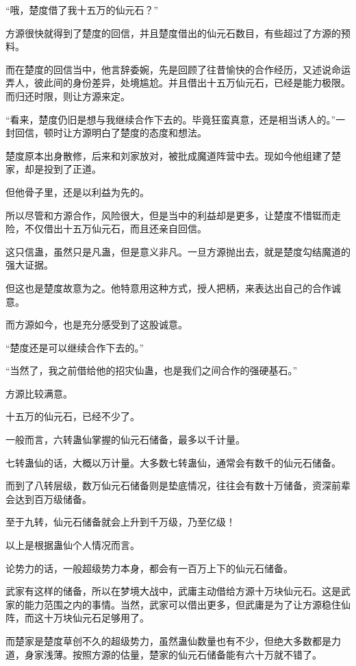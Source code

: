 
\begin{this_body}

“哦，楚度借了我十五万的仙元石？”

方源很快就得到了楚度的回信，并且楚度借出的仙元石数目，有些超过了方源的预料。

而在楚度的回信当中，他言辞委婉，先是回顾了往昔愉快的合作经历，又述说命运弄人，彼此间的身份差异，处境尴尬。并且借出十五万仙元石，已经是能力极限。而归还时限，则让方源来定。

“看来，楚度仍旧是想与我继续合作下去的。毕竟狂蛮真意，还是相当诱人的。”一封回信，顿时让方源明白了楚度的态度和想法。

楚度原本出身散修，后来和刘家放对，被批成魔道阵营中去。现如今他组建了楚家，却是投到了正道。

但他骨子里，还是以利益为先的。

所以尽管和方源合作，风险很大，但是当中的利益却是更多，让楚度不惜铤而走险，不仅借出十五万仙元石，而且还亲自回信。

这只信蛊，虽然只是凡蛊，但是意义非凡。一旦方源抛出去，就是楚度勾结魔道的强大证据。

但这也是楚度故意为之。他特意用这种方式，授人把柄，来表达出自己的合作诚意。

而方源如今，也是充分感受到了这股诚意。

“楚度还是可以继续合作下去的。”

“当然了，我之前借给他的招灾仙蛊，也是我们之间合作的强硬基石。”

方源比较满意。

十五万的仙元石，已经不少了。

一般而言，六转蛊仙掌握的仙元石储备，最多以千计量。

七转蛊仙的话，大概以万计量。大多数七转蛊仙，通常会有数千的仙元石储备。

而到了八转层级，数万仙元石储备则是垫底情况，往往会有数十万储备，资深前辈会达到百万级储备。

至于九转，仙元石储备就会上升到千万级，乃至亿级！

以上是根据蛊仙个人情况而言。

论势力的话，一般超级势力本身，都会有一百万上下的仙元石储备。

武家有这样的储备，所以在梦境大战中，武庸主动借给方源十万块仙元石。这是武家的能力范围之内的事情。当然，武家可以借出更多，但武庸是为了让方源稳住仙阵，而这十万块仙元石足够用了。

而楚家是楚度草创不久的超级势力，虽然蛊仙数量也有不少，但绝大多数都是力道，身家浅薄。按照方源的估量，楚家的仙元石储备能有六十万就不错了。


\end{this_body}
